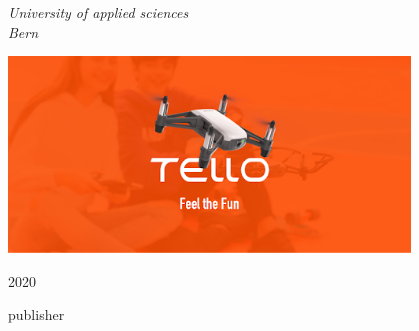 \begin{titlepage}
	\vspace{0.5\baselineskip} %

	\textit{University of applied sciences \\ Bern} %

	\vfill %


	\begin{center}
	\includegraphics[width=0.8\textwidth]{../common/resources/01_front_image.png}
	\end{center}

	\vspace{0.3\baselineskip} %

	2020 %

	{\large publisher} %

\end{titlepage}
